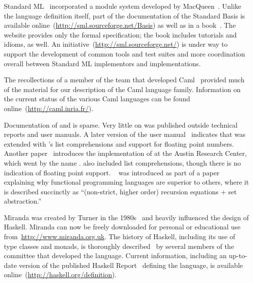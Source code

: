 Standard ML~\citep{Milner:The-Definition:1990,Milner:Commentary:1990,Milner:The-Definition:1997} incorporated a module system developed by MacQueen~\citep{MacQueen:Structure:1981,MacQueen:Modules:1984,MacQueen:Using:1986,MacQueen:A-semantics:1994}. Unlike the language definition itself, part of the documentation of the Standard Basis is available online~(\url{http://sml.sourceforge.net/Basis}) as well as in a book~\citep{Gansner:The-Standard:2002}. The website provides only the formal specification; the book includes tutorials and idioms, as well. An initiative~(\url{http://sml.sourceforge.net/}) is under way to support the development of common tools and test suites and more coordination overall between Standard ML implementors and implementations.

The recollections of a member of the team that developed Caml~\citep{Cousineau:A-brief:1996} provided much of the material for our description of the Caml language family. Information on the current status of the various Caml languages can be found online~(\url{http://caml.inria.fr/}).

Documentation of  and  is sparse. Very little on  was published outside technical reports and user manuals. A later version of the user manual~\citep{Turner:SASL:1976} indicates that  was extended with 's list comprehensions and support for floating point numbers. Another paper~\citep{Richards:An-overview:1984} introduces the implementation of  at the Austin Research Center, which went by the name .  also included list comprehensions, though there is no indication of floating point support. ~\citep{Turner:The-semantic:1981} was introduced as part of a paper explaining why functional programming languages are superior to others, where it is described succinctly as ``(non-strict, higher order) recursion equations + set abstraction.''

Miranda was created by Turner in the 1980s~\citep{Turner:Miranda:1985} and heavily influenced the design of Haskell. Miranda can now be freely downloaded for personal or educational use from~\url{http://www.miranda.org.uk}. The history of Haskell, including its use of type classes and monads, is thoroughly described~\citep{Hudak:A-history:2007} by several members of the committee that developed the language. Current information, including an up-to-date version of the published Haskell Report~\citep{Peyton-Jones:Haskell:2003} defining the language, is available online~(\url{http://haskell.org/definition}).


